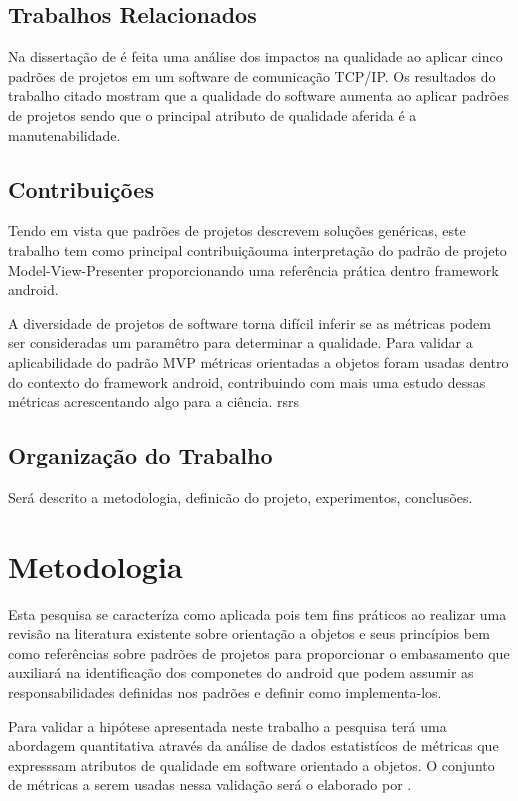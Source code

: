 \section{Trabalhos Relacionados}

Na dissertação de  é feita uma análise dos impactos na
qualidade ao aplicar cinco padrões de projetos em um software de comunicação
TCP/IP. Os resultados do trabalho citado mostram que a qualidade do software
aumenta ao aplicar padrões de projetos sendo que o principal atributo de
qualidade aferida é a manutenabilidade.

\section{Contribuições}


Tendo em vista que padrões de projetos descrevem soluções genéricas, este
trabalho tem como principal contribuiçãouma interpretação do padrão de projeto
Model-View-Presenter proporcionando uma referência prática dentro framework
android.

A diversidade de projetos de software torna difícil inferir se as métricas
podem ser consideradas um paramêtro para determinar a qualidade. Para validar a
aplicabilidade do padrão MVP métricas orientadas a objetos foram usadas
dentro do contexto do framework android, contribuindo com mais uma estudo dessas
métricas acrescentando algo para a ciência. rsrs

\section{Organização do Trabalho}

Será descrito a metodologia, definicão do projeto, experimentos, conclusões.


\chapter{Metodologia}

Esta pesquisa se caracteríza como aplicada pois tem fins práticos ao realizar
uma revisão na literatura existente sobre orientação a objetos e seus princípios
bem como referências sobre padrões de projetos para proporcionar o embasamento
que auxiliará na identificação dos componetes do android que podem assumir as
responsabilidades definidas nos padrões e definir como implementa-los.

Para validar a hipótese apresentada neste trabalho a pesquisa terá uma
abordagem quantitativa através da análise de dados estatistícos de métricas 
que expresssam atributos de qualidade em software orientado a objetos. O
conjunto de métricas a serem usadas nessa validação será o elaborado por
.


